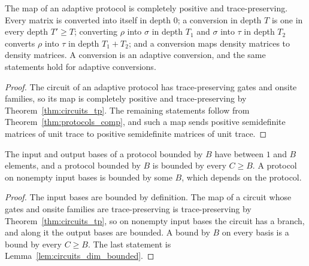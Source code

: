 \begin{lemma}[Conversions]
    \label{lem:protocols_conversion}
    \leanok
    The map of an adaptive protocol is completely positive and trace-preserving. Every matrix
    is converted into itself in depth $0$; a conversion in depth $T$ is one in every depth
    $T'\ge T$; converting $\rho$ into $\sigma$ in depth $T_1$ and $\sigma$ into $\tau$ in
    depth $T_2$ converts $\rho$ into $\tau$ in depth $T_1+T_2$; and a conversion maps density
    matrices to density matrices. A conversion is an adaptive conversion, and the same
    statements hold for adaptive conversions.
\end{lemma}
\begin{proof}\leanok
    The circuit of an adaptive protocol has trace-preserving gates and onsite families, so its
    map is completely positive and trace-preserving by Theorem~\ref{thm:circuits_tp}. The
    remaining statements follow from Theorem~\ref{thm:protocols_comp}, and such a map sends
    positive semidefinite matrices of unit trace to positive semidefinite matrices of unit
    trace.
\end{proof}

\begin{lemma}
    \label{lem:protocols_dimension_bound}
    \leanok
    The input and output bases of a protocol bounded by $B$ have between $1$ and $B$
    elements, and a protocol bounded by $B$ is bounded by every $C\ge B$. A protocol on
    nonempty input bases is bounded by some $B$, which depends on the protocol.
\end{lemma}
\begin{proof}\leanok
    The input bases are bounded by definition. The map of a circuit whose gates and onsite
    families are trace-preserving is trace-preserving by Theorem~\ref{thm:circuits_tp}, so on
    nonempty input bases the circuit has a branch, and along it the output bases are bounded. A
    bound by $B$ on every basis is a bound by every $C\ge B$. The last statement is
    Lemma~\ref{lem:circuits_dim_bounded}.
\end{proof}

